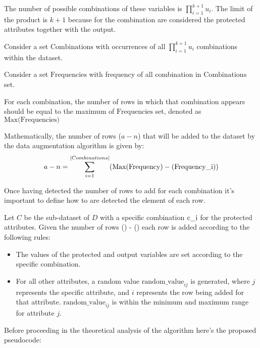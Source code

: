 The number of possible combinations of these variables is $\prod_{i=1}^{k+1} u_i$. The limit of the product is ${k + 1}$ because for the combination are considered the protected attributes together with the output.

Consider a set $\text{Combinations}$ with occurrences of all $\prod_{i=1}^{k+1} u_i$ combinations within the dataset. 

Consider a set $\text{Frequencies}$ with frequency of all combination in $\text{Combinations}$ set.

For each combination, the number of rows in which that combination appears should be equal to the maximum of $\text{Frequencies}$ set, denoted as $\text{Max(Frequencies)}$

Mathematically, the number of rows ($a - n$) that will be added to the dataset by the data augmentation algorithm is given by:
\[
a - n = \sum_{i=1}^{|Combinations|}(\text{Max}(\text{Frequency}) - (\text{Frequency\textunderscore i}))
\]

Once having detected the number of rows to add for each combination it's important to define how to are detected the element of each row.

Let $C$ be the sub-dataset of $D$ with a specific combination $\text{c\textunderscore i}$ for the protected attributes. Given the number of rows () - () each row is added according to the following rules:

\begin{itemize}
    
    \item The values of the protected and output variables are set according to the specific combination.
   
    \item For all other attributes, a random value $\text{random\_value}_{ij}$ is generated, where $j$ represents the specific attribute, and $i$ represents the row being added for that attribute. $\text{random\_value}_{ij}$ is within the minimum and maximum range for attribute $j$.

\end{itemize}

\newpage
Before proceeding in the theoretical analysis of the algorithm here's the proposed pseudocode:

